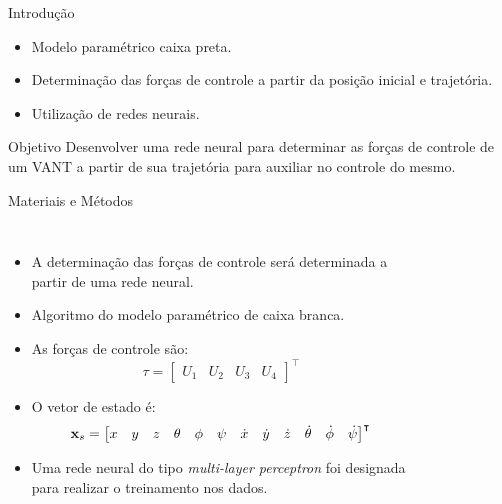 \begin{frame}{Introdução}
    
\begin{itemize}
    \item Modelo paramétrico caixa preta.
    \item Determinação das forças de controle a partir da posição inicial e trajetória.
    \item Utilização de redes neurais.
\end{itemize}

\begin{block}{Objetivo}
    Desenvolver uma rede neural para determinar as forças de controle de um VANT a partir de sua trajetória para auxiliar no controle do mesmo.
\end{block}
\end{frame}

\begin{frame}{Materiais e Métodos}
\begin{columns}
\begin{itemize}
    \item A determinação das forças de controle será determinada a partir de uma \alert{rede neural}.
    \item Algoritmo do modelo paramétrico de caixa branca.
    \item As forças de controle são:
    \begin{equation*}
        \tau = \begin{bmatrix}
            U_1 & U_2 & U_3 & U_4
        \end{bmatrix}^{\intercal}
    \end{equation*}
    \item O vetor de estado é:
    \begin{equation*}
        \setcounter{MaxMatrixCols}{20}
        \mathbf{x}_s = \begin{bmatrix}
            x & y & z & \theta & \phi & \psi & \dot{x} & \dot{y} & \dot{z} & \dot{\theta} & \dot{\phi} & \dot{\psi}
        \end{bmatrix}^{\intercal}
    \end{equation*}
    \item Uma rede neural do tipo \emph{multi-layer perceptron} foi designada para realizar o treinamento nos dados.
\end{itemize}
\begin{figure}[H]
    \centering
    
\end{figure}
\end{columns}
\end{frame}

